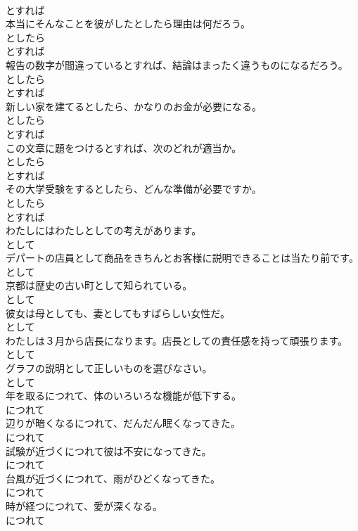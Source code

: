 \documentclass[8pt]{extreport}
\begin{document}
\begin{CJK}{UTF8}{min}
\\	とすれば
\\	本当にそんなことを彼がしたとしたら理由は何だろう。	
\\	としたら 
\\	とすれば
\\	報告の数字が間違っているとすれば、結論はまったく違うものになるだろう。	
\\	としたら 
\\	とすれば
\\	新しい家を建てるとしたら、かなりのお金が必要になる。	
\\	としたら 
\\	とすれば
\\	この文章に題をつけるとすれば、次のどれが適当か。	
\\	としたら 
\\	とすれば
\\	その大学受験をするとしたら、どんな準備が必要ですか。	
\\	としたら 
\\	とすれば
\\	わたしにはわたしとしての考えがあります。	
\\	として
\\	デパートの店員として商品をきちんとお客様に説明できることは当たり前です。	
\\	として
\\	京都は歴史の古い町として知られている。	
\\	として
\\	彼女は母としても、妻としてもすばらしい女性だ。	
\\	として
\\	わたしは３月から店長になります。店長としての責任感を持って頑張ります。	
\\	として
\\	グラフの説明として正しいものを選びなさい。	
\\	として
\\	年を取るにつれて、体のいろいろな機能が低下する。	
\\	につれて
\\	辺りが暗くなるにつれて、だんだん眠くなってきた。	
\\	につれて
\\	試験が近づくにつれて彼は不安になってきた。	
\\	につれて
\\	台風が近づくにつれて、雨がひどくなってきた。	
\\	につれて
\\	時が経つにつれて、愛が深くなる。	
\\	につれて

\end{CJK}
\end{document}
